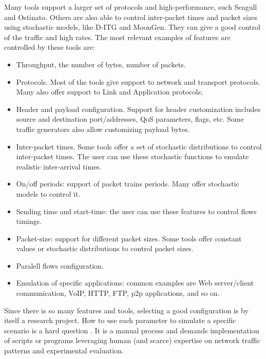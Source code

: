 Many tools support a larger set of protocols and high-performance, such Seagull and Ostinato. Others are also able to control inter-packet times and packet sizes using stochastic models, like D-ITG\cite{ditg-paper} and MoonGen. They can give a good control of the traffic and high rates. The most relevant examples of features are controlled by these tools are:

\begin{itemize}


\item Throughput, the number of bytes, number of packets.


\item Protocols. Most of the tools give support to network and transport protocols. Many also offer support to Link and Application protocols;


\item Header and payload configuration. Support for header customization includes source and destination port/addresses, QoS parameters, flags, etc. Some traffic generators also allow customizing payload bytes.


\item Inter-packet times. Some tools offer a set of stochastic distributions to control inter-packet times. The user can use these stochastic functions to emulate realistic inter-arrival times.


\item On/off periods: support of packet trains periods. Many offer stochastic models to control it. 


\item Sending time and start-time: the user can use these features to control flows timings.  


\item Packet-size: support for different packet sizes. Some tools offer constant values or stochastic distributions to control packet sizes.


\item Paralell flows configuration.


\item Emulation of specific applications: common examples are Web server/client communication, VoIP, HTTP, FTP, p2p applications, and so on.

\end{itemize}


Since there is so many features and tools, selecting a good configuration is by itself a research project. How to use each parameter to simulate a specific scenario is a hard question \cite{legotg-paper}\cite{selfsimilar-ethernet}. It is a manual process and demands implementation of scripts or programs leveraging human (and scarce) expertise on network traffic patterns and experimental evaluation.


